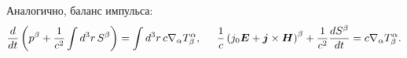 Аналогично, баланс импульса:
\begin{equation*}
    \frac{d }{d t} \left(p^\beta + \frac{1}{c^2} \int d^3 r \, S^\beta\right) = \int d^3 r \, c \nabla_\alpha T^\alpha_\beta,
    \hspace{5 mm} 
    \frac{1}{c}\left(
        j_0 \mbox{\boldmath $E$} + \mbox{\boldmath $j$} \times  \mbox{\boldmath $H$}
    \right)^\beta + \frac{1}{c^2} \frac{d S^\beta}{d t} = c \nabla_\alpha T^\alpha_\beta.
\end{equation*}